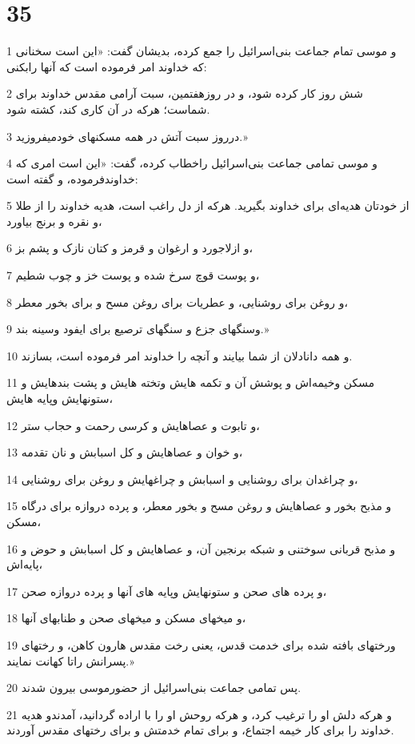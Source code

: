 \chapter{35}

\par 1 و موسی تمام جماعت بنی‌اسرائیل را جمع کرده، بدیشان گفت: «این است سخنانی که خداوند امر فرموده است که آنها رابکنی:
\par 2 شش روز کار کرده شود، و در روزهفتمین، سبت آرامی مقدس خداوند برای شماست؛ هر‌که در آن کاری کند، کشته شود.
\par 3 درروز سبت آتش در همه مسکنهای خودمیفروزید.»
\par 4 و موسی تمامی جماعت بنی‌اسرائیل راخطاب کرده، گفت: «این است امری که خداوندفرموده، و گفته است:
\par 5 از خودتان هدیه‌ای برای خداوند بگیرید. هر‌که از دل راغب است، هدیه خداوند را از طلا و نقره و برنج بیاورد،
\par 6 و ازلاجورد و ارغوان و قرمز و کتان نازک و پشم بز،
\par 7 و پوست قوچ سرخ شده و پوست خز و چوب شطیم،
\par 8 و روغن برای روشنایی، و عطریات برای روغن مسح و برای بخور معطر،
\par 9 وسنگهای جزع و سنگهای ترصیع برای ایفود وسینه بند.»
\par 10 و همه دانادلان از شما بیایند و آنچه را خداوند امر فرموده است، بسازند.
\par 11 مسکن وخیمه‌اش و پوشش آن و تکمه هایش وتخته هایش و پشت بندهایش و ستونهایش وپایه هایش،
\par 12 و تابوت و عصاهایش و کرسی رحمت و حجاب ستر،
\par 13 و خوان و عصاهایش و کل اسبابش و نان تقدمه،
\par 14 و چراغدان برای روشنایی و اسبابش و چراغهایش و روغن برای روشنایی،
\par 15 و مذبح بخور و عصاهایش و روغن مسح و بخور معطر، و پرده دروازه برای درگاه مسکن،
\par 16 و مذبح قربانی سوختنی و شبکه برنجین آن، و عصاهایش و کل اسبابش و حوض و پایه‌اش،
\par 17 و پرده های صحن و ستونهایش وپایه های آنها و پرده دروازه صحن،
\par 18 و میخهای مسکن و میخهای صحن و طنابهای آنها،
\par 19 ورختهای بافته شده برای خدمت قدس، یعنی رخت مقدس هارون کاهن، و رختهای پسرانش راتا کهانت نمایند.»
\par 20 پس تمامی جماعت بنی‌اسرائیل از حضورموسی بیرون شدند.
\par 21 و هر‌که دلش او را ترغیب کرد، و هر‌که روحش او را با اراده گردانید، آمدندو هدیه خداوند را برای کار خیمه اجتماع، و برای تمام خدمتش و برای رختهای مقدس آوردند.
